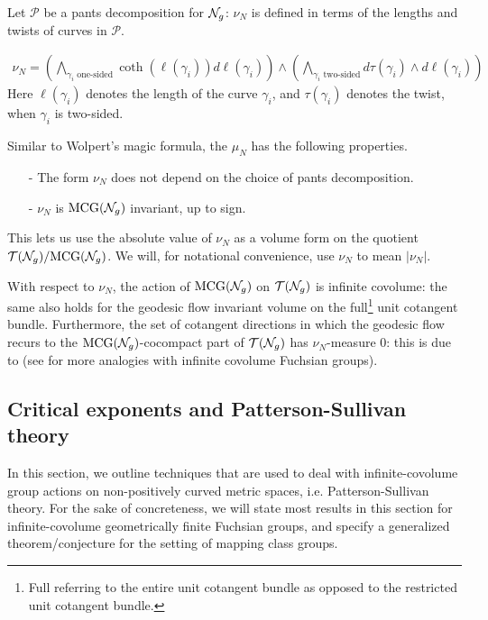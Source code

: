 Let $\mathcal{P}$ be a pants decomposition for $\mathcal{N}_g$: $\nu_N$ is defined in terms of the lengths and twists of curves in $\mathcal{P}$.

\begin{align*}
  \nu_N = \left( \bigwedge_{\text{$\gamma_i$ one-sided}} \coth(\ell(\gamma_i)) d\ell(\gamma_i) \right) \wedge \left( \bigwedge_{\text{$\gamma_i$ two-sided}} d\tau(\gamma_i) \wedge d\ell(\gamma_i) \right)
\end{align*}
Here $\ell(\gamma_i)$ denotes the length of the curve $\gamma_i$, and $\tau(\gamma_i)$ denotes the twist, when $\gamma_i$ is two-sided.

Similar to Wolpert's magic formula, the $\mu_N$ has the following properties.
\begin{itemize}
\item[-] The form $\nu_N$ does not depend on the choice of pants decomposition.
\item[-] $\nu_N$ is $\mathrm{MCG}(\mathcal{N}_g)$ invariant, up to sign.
\end{itemize}
This lets us use the absolute value of $\nu_N$ as a volume form on the quotient $\mathcal{T}(\mathcal{N}_g) / \mathrm{MCG}(\mathcal{N}_g)$.
We will, for notational convenience, use $\nu_N$ to mean $\left| \nu_N \right|$.

With respect to $\nu_N$, the action of $\mathrm{MCG}(\mathcal{N}_g)$ on $\mathcal{T}(\mathcal{N}_g)$ is infinite covolume: the same also holds for the geodesic flow invariant volume on the full\footnote{Full referring to the entire unit cotangent bundle as opposed to the restricted unit cotangent bundle.} unit cotangent bundle.
Furthermore, the set of cotangent directions in which the geodesic flow recurs to the $\mathrm{MCG}(\mathcal{N}_g)$-cocompact part of $\mathcal{T}(\mathcal{N}_g)$ has $\nu_N$-measure $0$: this is due to \textcite{norbury2008lengths} (see \textcite{gendulphe2017whats} for more analogies with infinite covolume Fuchsian groups).

\subsection{Critical exponents and Patterson-Sullivan theory}
\label{sec:crit-expon-patt}

In this section, we outline techniques that are used to deal with infinite-covolume group actions on non-positively curved metric spaces, i.e. Patterson-Sullivan theory.
For the sake of concreteness, we will state most results in this section for infinite-covolume geometrically finite Fuchsian groups, and specify a generalized theorem/conjecture for the setting of mapping class groups.

